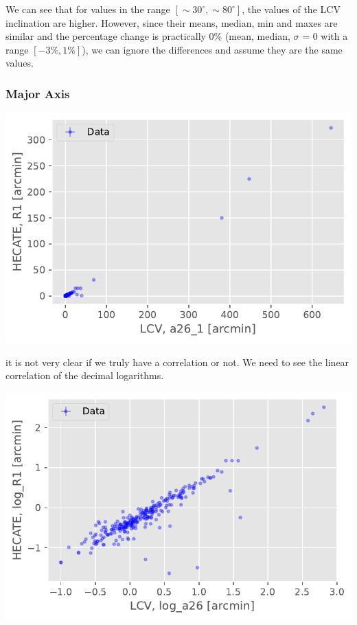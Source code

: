 \documentclass[
]{article}
\begin{document}
We can see that for values in the range
\([\sim 30^\circ,\sim 80^\circ]\), the values of the LCV inclination are
higher. However, since their means, median, min and maxes are similar
and the percentage change is practically 0\% (mean, median, \(\sigma\) =
0 with a range \([-3\%,1\%]\)), we can ignore the differences and assume
they are the same values.

\subsubsection{Major Axis}

\includegraphics{compare_files/figure-pdf/cell-30-output-1.pdf}

it is not very clear if we truly have a correlation or not. We need to
see the linear correlation of the decimal logarithms.

\includegraphics{compare_files/figure-pdf/cell-32-output-1.pdf}
\end{document}
